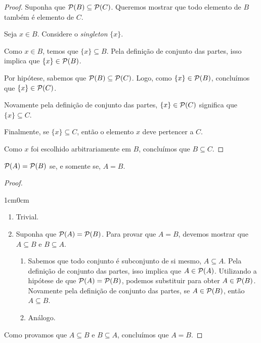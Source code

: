 \begin{proof}
    Suponha que \(\mathcal{P}(B) \subseteq \mathcal{P}(C)\). Queremos mostrar que todo elemento de \(B\) também é elemento de \(C\).

    Seja \(x \in B\). Considere o \textit{singleton} \(\{x\}\).

    Como \(x \in B\), temos que \(\{x\} \subseteq B\). Pela definição de conjunto das partes, isso implica que \(\{x\} \in \mathcal{P}(B)\).

    Por hipótese, sabemos que \(\mathcal{P}(B) \subseteq \mathcal{P}(C)\). Logo, como \(\{x\} \in \mathcal{P}(B)\), concluímos que \(\{x\} \in \mathcal{P}(C)\).

    Novamente pela definição de conjunto das partes, \(\{x\} \in \mathcal{P}(C)\) significa que \(\{x\} \subseteq C\).

    Finalmente, se \(\{x\} \subseteq C\), então o elemento \(x\) deve pertencer a \(C\).

    Como \(x\) foi escolhido arbitrariamente em \(B\), concluímos que \(B \subseteq C\).
\end{proof}

\begin{proposicao}
    \label{prop:igualdade_partes_implica_igualdade_conjuntos}
    \(\mathcal{P}(A) = \mathcal{P}(B)\) se, e somente se, \(A = B\).
\end{proposicao}

\begin{proof}
    \begin{adjustwidth}{1cm}{0cm}
        \begin{enumerate}
            \item[\((\impliedby)\)] Trivial.
            \item[\((\implies)\)] Suponha que \(\mathcal{P}(A) = \mathcal{P}(B)\). Para provar que \(A = B\), devemos mostrar que \(A \subseteq B\) e \(B \subseteq A\).

                  \begin{enumerate}
                      \item[\((\sub)\)] Sabemos que todo conjunto é subconjunto de si mesmo, \(A \subseteq A\).
                            Pela definição de conjunto das partes, isso implica que \(A \in \mathcal{P}(A)\).
                            Utilizando a hipótese de que \(\mathcal{P}(A) = \mathcal{P}(B)\), podemos substituir para obter \(A \in \mathcal{P}(B)\).
                            Novamente pela definição de conjunto das partes, se \(A \in \mathcal{P}(B)\), então \(A \subseteq B\).
                      \item[\((\supseteq)\)] Análogo.
                  \end{enumerate}
        \end{enumerate}
    \end{adjustwidth}
    Como provamos que \(A \subseteq B\) e \(B \subseteq A\), concluímos que \(A = B\).
\end{proof}

